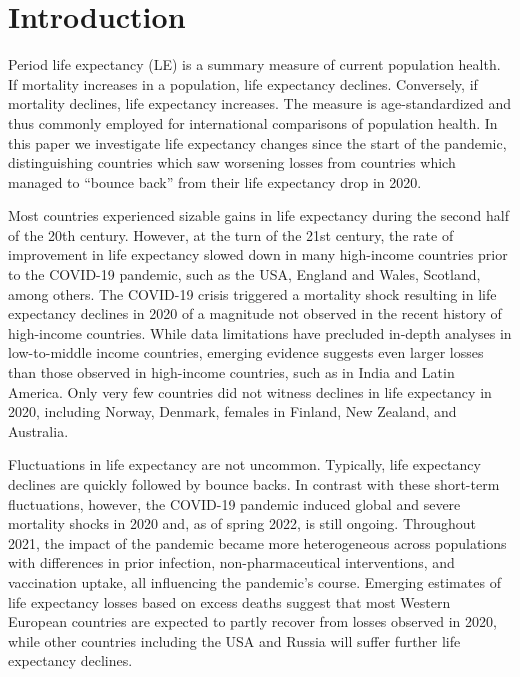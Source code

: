 \documentclass[12pt]{article}
\begin{document}

\section*{Introduction}

Period life expectancy (LE) is a summary measure of current population health. If mortality increases in a population, life expectancy declines. Conversely, if mortality declines, life expectancy increases. The measure is age-standardized and thus commonly employed for international comparisons of population health.  In this paper we investigate life expectancy changes since the start of the pandemic, distinguishing countries which saw worsening losses from countries which managed to ``bounce back'' from their life expectancy drop in 2020.

Most countries experienced sizable gains in life expectancy during the second half of the 20th century.\citealp{Riley2005} However, at the turn of the 21st century, the rate of improvement in life expectancy slowed down in many high-income countries prior to the COVID-19 pandemic,\citealp{Raleigh2019} such as the USA,\citealp{Ho2018} England and Wales,\citealp{Hiam2018} Scotland,\citealp{Fenton2019} among others.\citealp{Ho2018} The COVID-19 crisis triggered a mortality shock resulting in life expectancy declines in 2020 of a magnitude not observed in the recent history of high-income countries.\citealp{Aburto2021b, Islam2021a, Andrasfay2021, Mazzuco2022} While data limitations have precluded in-depth analyses in low-to-middle income countries, emerging evidence suggests even larger losses than those observed in high-income countries, such as in India\citealp{Yadav2021} and Latin America.\citealp{Castro2021, GarciaGuerrero2021, Lima2021} Only very few countries did not witness declines in life expectancy in 2020, including Norway, Denmark, females in Finland, New Zealand, and Australia.\citealp{Aburto2021b, Islam2021a, CanudasRomo2022, Rizzi2021a}

Fluctuations in life expectancy are not uncommon. Typically, life expectancy declines are quickly followed by bounce backs.\citealp{Saha2013, Kissler2021} In contrast with these short-term fluctuations, however, the COVID-19 pandemic induced global and severe mortality shocks in 2020 and, as of spring 2022, is still ongoing. Throughout 2021, the impact of the pandemic became more heterogeneous across populations with differences in prior infection, non-pharmaceutical interventions, and vaccination uptake, all influencing the pandemic's course. Emerging estimates of life expectancy losses based on excess deaths suggest that most Western European countries are expected to partly recover from losses observed in 2020, while other countries including the USA and Russia will suffer further life expectancy declines.\citealp{Heuveline2022}
\end{document}
